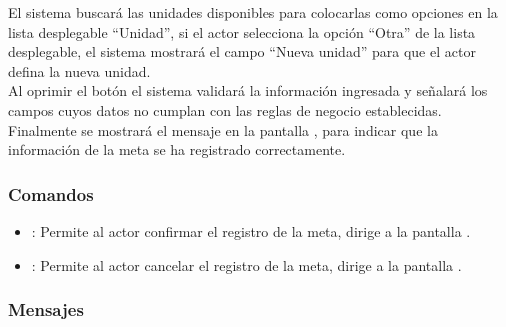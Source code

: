 
  
  El sistema buscará las unidades disponibles para colocarlas como opciones en la lista desplegable ``Unidad'', si el actor selecciona la opción ``Otra'' de la lista desplegable, el sistema mostrará
  el campo ``Nueva unidad'' para que el actor defina la nueva unidad.\\
  
  Al oprimir el botón  el sistema validará la información ingresada y señalará los campos cuyos datos no cumplan con las reglas de negocio establecidas.\\
  
  Finalmente se mostrará el mensaje  en la pantalla , para indicar que la información de la
  meta se ha registrado correctamente.
    
\subsubsection{Comandos}
\begin{itemize}
	\item {}: Permite al actor confirmar el registro de la meta, dirige a la pantalla .
	\item {}: Permite al actor cancelar el registro de la meta, dirige a la pantalla .
\end{itemize}


\subsubsection{Mensajes}


